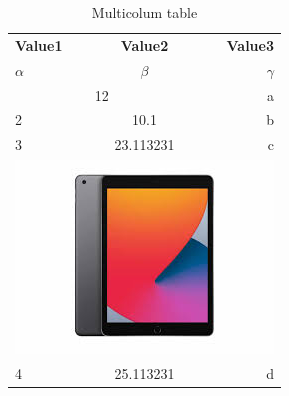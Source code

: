 \documentclass{article}
\begin{document}
    \begin{table}
    	\begin{center}
    		\caption{Multicolum table}
    		\label{tab:table1}
    		\begin{tabular}{l|c|r}
    			\hline\textbf{Value1} & \textbf{Value2} & \textbf{Value3}\\ 
    			$\alpha$ & $\beta$ & $\gamma$ \\
    			\hline
    			\multicolumn{2}{|c|}{12} & a\\
    			\hline
    			2 & 10.1 & b\\
    			3 & 23.113231 & c\\
    			\hline
    			\multicolumn{3}{|c|}{\includegraphics[width=0.15\linewidth]{"image"}}\\
    			\hline
    			4 & 25.113231 & d\\
    			\hline
    		\end{tabular}
    	\end{center}
    \end{table}
\end{document}
